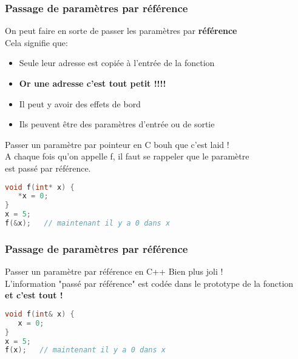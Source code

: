 \documentclass{beamer}
\begin{document}
\begin{frame}[fragile=singleslide,shrink=20]
\frametitle{Passage de paramètres par référence}
On peut faire en sorte de passer les paramètres par \textbf{référence} \\
Cela signifie que:
\begin{itemize}
\item{Seule leur adresse est copiée à l'entrée de la fonction}
\item{\textbf{Or une adresse c'est tout petit !!!!}}
\item{Il peut y avoir des effets de bord}
\item{Ils peuvent être des paramètres d'entrée ou de sortie}
\end{itemize}

\begin{block}{Passer un paramètre par pointeur en C}
bouh que c'est laid ! \\
A chaque fois qu'on appelle f, il faut se rappeler que le paramètre \\
est passé par référence.
\begin{lstlisting}[language=c++]
void f(int* x) {
   *x = 0;
}
x = 5;
f(&x);   // maintenant il y a 0 dans x
\end{lstlisting}
\end{block}
\end{frame}

\begin{frame}[fragile=singleslide,shrink=20]
\frametitle{Passage de paramètres par référence}
\begin{block}{Passer un paramètre par référence en C++}
Bien plus joli ! \\
L'information "passé par référence" est codée dans le prototype de la fonction \\
\textbf{et c'est tout !}
\begin{lstlisting}[language=c++]
void f(int& x) {
   x = 0;
}
x = 5;
f(x);   // maintenant il y a 0 dans x
\end{lstlisting}
\end{block}
\end{frame}
\end{document}
